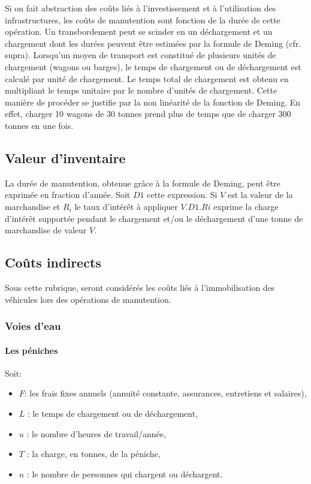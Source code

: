 Si on fait abstraction des coûts liés à l'investissement et à
l'utilisation des infrastructures, les coûts de manutention sont
fonction de la durée de cette opération. Un transbordement peut se
scinder en un déchargement et un charge\-ment dont les durées peuvent
être estimées par la formule de Deming (cfr. supra). Lorsqu'un
moyen de transport est constitué de plusieurs unités de chargement
(wagons ou barges), le temps de chargement ou de déchargement est
calculé par unité de chargement. Le temps total de chargement est
obtenu en multipliant le temps unitaire par le nombre d'unités de
chargement. Cette manière de procéder se justifie par la non
linéarité de la fonction de Deming. En effet, charger 10 wagons de
30 tonnes prend plus de temps que de charger 300 tonnes en une
fois.


\subsection{Valeur d'inventaire}

La durée de manutention, obtenue grâce à la formule de Deming, peut
être exprimée en fraction d'année. Soit $D1$ cette expression. Si
$V$ est la valeur de la marchandise et $R_i$ le taux d'intérêt à
appliquer $V.D1.Ri$ exprime la charge d'intérêt supportée pendant
le chargement et/ou le déchargement d'une tonne de marchandise de
valeur $V$.

\subsection{Co\^uts indirects}

Sous cette rubrique, seront considérés les coûts liés à
l'immobilisation des véhi\-cules lors des opérations de manutention.

\subsubsection{Voies d'eau}

\paragraph{Les péniches}

Soit:

\begin{itemize}
\item $F$: les frais fixes annuels (annuité constante, assurances,
entretiens et salaires),
\item $L$ : le temps de chargement ou de déchargement,
\item $u$ : le nombre d'heures de travail/année,
\item $T$ : la charge, en tonnes, de la péniche,
\item $n$ : le nombre de personnes qui chargent ou déchargent.
\end{itemize}

